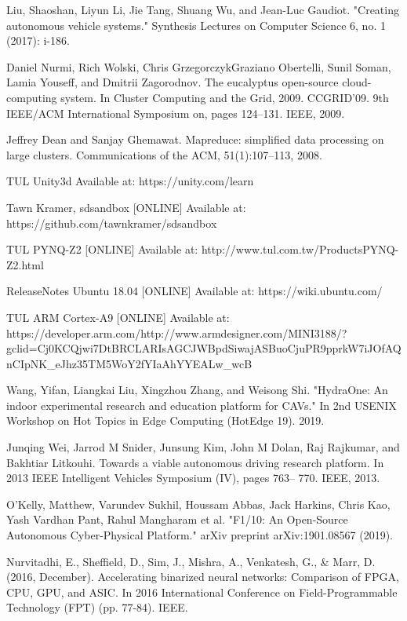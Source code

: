 \documentclass[conference]{IEEEtran}
\begin{document}
\begin{thebibliography}{00}

 Liu, Shaoshan, Liyun Li, Jie Tang, Shuang Wu, and Jean-Luc Gaudiot. "Creating autonomous vehicle systems." Synthesis Lectures on Computer Science 6, no. 1 (2017): i-186.

 Daniel Nurmi, Rich Wolski, Chris GrzegorczykGraziano Obertelli, Sunil Soman, Lamia Youseff, and Dmitrii Zagorodnov. The eucalyptus open-source cloud-computing system. In Cluster Computing and the Grid, 2009. CCGRID’09. 9th IEEE/ACM International Symposium on, pages 124–131. IEEE, 2009.

 Jeffrey Dean and Sanjay Ghemawat. Mapreduce: simplified data processing on large clusters. Communications
of the ACM, 51(1):107–113, 2008.

 TUL Unity3d Available at: https://unity.com/learn

 Tawn Kramer, sdsandbox [ONLINE] Available at: https://github.com/tawnkramer/sdsandbox

 TUL PYNQ-Z2 [ONLINE] Available at: http://www.tul.com.tw/ProductsPYNQ-Z2.html

 ReleaseNotes Ubuntu 18.04 [ONLINE] Available at: https://wiki.ubuntu.com/

 TUL ARM Cortex-A9 [ONLINE] Available at: https://developer.arm.com/http://www.armdesigner.com/MINI3188/?gclid=Cj0KCQjwi7DtBRCLARIsAGCJWBpdSiwajASBuoCjuPR9pprkW7iJOfAQnCIpNK\_eJhz35TM5WoY2fYIaAhYYEALw\_wcB

 Wang, Yifan, Liangkai Liu, Xingzhou Zhang, and Weisong Shi. "HydraOne: An indoor experimental research and education platform for CAVs." In 2nd {USENIX} Workshop on Hot Topics in Edge Computing (HotEdge 19). 2019.

 Junqing Wei, Jarrod M Snider, Junsung Kim, John M
Dolan, Raj Rajkumar, and Bakhtiar Litkouhi. Towards
a viable autonomous driving research platform. In 2013
IEEE Intelligent Vehicles Symposium (IV), pages 763–
770. IEEE, 2013.

 O'Kelly, Matthew, Varundev Sukhil, Houssam Abbas, Jack Harkins, Chris Kao, Yash Vardhan Pant, Rahul Mangharam et al. "F1/10: An Open-Source Autonomous Cyber-Physical Platform." arXiv preprint arXiv:1901.08567 (2019).

 Nurvitadhi, E., Sheffield, D., Sim, J., Mishra, A., Venkatesh, G., \& Marr, D. (2016, December). Accelerating binarized neural networks: Comparison of FPGA, CPU, GPU, and ASIC. In 2016 International Conference on Field-Programmable Technology (FPT) (pp. 77-84). IEEE.


\end{thebibliography}
\end{document}
